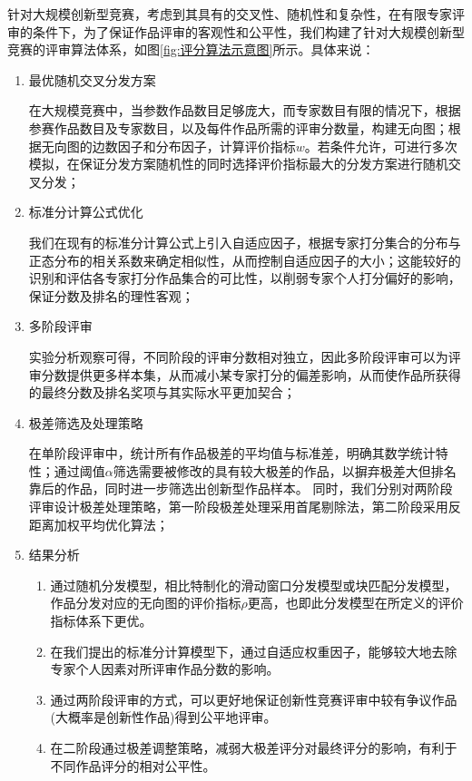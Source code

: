 \documentclass[bwprint]{gmcmthesis}
\begin{document}
 针对大规模创新型竞赛，考虑到其具有的交叉性、随机性和复杂性，在有限专家评审的条件下，为了保证作品评审的客观性和公平性，我们构建了针对大规模创新型竞赛的评审算法体系，如图\ref{fig:评分算法示意图}所示。具体来说：
\begin{enumerate}
	\par
	\item 最优随机交叉分发方案
	
	在大规模竞赛中，当参数作品数目足够庞大，而专家数目有限的情况下，根据参赛作品数目及专家数目，以及每件作品所需的评审分数量，构建无向图；根据无向图的边数因子和分布因子，计算评价指标$w$。若条件允许，可进行多次模拟，在保证分发方案随机性的同时选择评价指标最大的分发方案进行随机交叉分发；
	
	\item 标准分计算公式优化
	
	我们在现有的标准分计算公式上引入自适应因子，根据专家打分集合的分布与正态分布的相关系数来确定相似性，从而控制自适应因子的大小；这能较好的识别和评估各专家打分作品集合的可比性，以削弱专家个人打分偏好的影响，保证分数及排名的理性客观；
	
	\item 多阶段评审
	
	实验分析观察可得，不同阶段的评审分数相对独立，因此多阶段评审可以为评审分数提供更多样本集，从而减小某专家打分的偏差影响，从而使作品所获得的最终分数及排名奖项与其实际水平更加契合；
	
	\item 极差筛选及处理策略
	
	在单阶段评审中，统计所有作品极差的平均值与标准差，明确其数学统计特性；通过阈值$\alpha$筛选需要被修改的具有较大极差的作品，以摒弃极差大但排名靠后的作品，同时进一步筛选出创新型作品样本。
	同时，我们分别对两阶段评审设计极差处理策略，第一阶段极差处理采用首尾剔除法，第二阶段采用反距离加权平均优化算法；
	
	\item 结果分析
	\begin{enumerate}
		\item 通过随机分发模型，相比特制化的滑动窗口分发模型或块匹配分发模型，作品分发对应的无向图的评价指标$\rho$更高，也即此分发模型在所定义的评价指标体系下更优。
		
		\item 在我们提出的标准分计算模型下，通过自适应权重因子，能够较大地去除专家个人因素对所评审作品分数的影响。
		
		\item 通过两阶段评审的方式，可以更好地保证创新性竞赛评审中较有争议作品(大概率是创新性作品)得到公平地评审。
		
		\item 在二阶段通过极差调整策略，减弱大极差评分对最终评分的影响，有利于不同作品评分的相对公平性。
	\end{enumerate}
	
	
\end{enumerate}
\newpage
\end{document}
